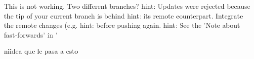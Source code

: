 This is not working. Two different branches?
hint: Updates were rejected because the tip of your current branch is behind
hint: its remote counterpart. Integrate the remote changes (e.g.
hint:  before pushing again.
hint: See the 'Note about fast-forwards' in '

niidea que le pasa a esto
